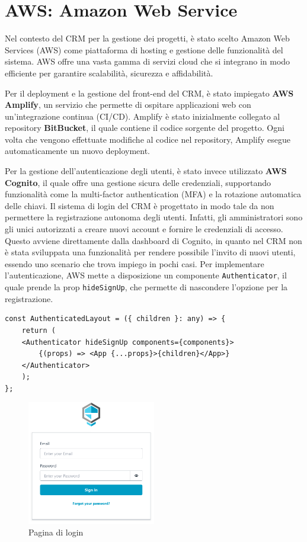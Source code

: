 \documentclass[target=bach,aauheader=,style=]{thud}
\begin{document}
\section{AWS: Amazon Web Service}
Nel contesto del CRM per la gestione dei progetti, è stato scelto Amazon Web Services (AWS) come piattaforma di hosting e gestione delle funzionalità del sistema. AWS offre una vasta gamma di servizi cloud che si integrano in modo efficiente per garantire scalabilità, sicurezza e affidabilità.

\noindent Per il deployment e la gestione del front-end del CRM, è stato impiegato \textbf{AWS Amplify}, un servizio che permette di ospitare applicazioni web con un'integrazione continua (CI/CD). Amplify è stato inizialmente collegato al repository \textbf{BitBucket}, il quale contiene il codice sorgente del progetto. Ogni volta che vengono effettuate modifiche al codice nel repository, Amplify esegue automaticamente un nuovo deployment.

\noindent Per la gestione dell'autenticazione degli utenti, è stato invece utilizzato \textbf{AWS Cognito}, il quale offre una gestione sicura delle credenziali, supportando funzionalità come la multi-factor authentication (MFA) e la rotazione automatica delle chiavi. Il sistema di login del CRM è progettato in modo tale da non permettere la registrazione autonoma degli utenti. Infatti, gli amministratori sono gli unici autorizzati a creare nuovi account e fornire le credenziali di accesso. Questo avviene direttamente dalla dashboard di Cognito, in quanto nel CRM non è stata sviluppata una funzionalità per rendere possibile l'invito di nuovi utenti, essendo uno scenario che trova impiego in pochi casi. Per implementare l'autenticazione, AWS mette a disposizione un componente \texttt{Authenticator}, il quale prende la prop \texttt{hideSignUp}, che permette di nascondere l'opzione per la registrazione.

\begin{lstlisting}[caption=Parte del file \texttt{AuthenticatedLayout.tsx} del CRM]
const AuthenticatedLayout = ({ children }: any) => {
    return (
    <Authenticator hideSignUp components={components}>
        {(props) => <App {...props}>{children}</App>}
    </Authenticator>
    );
};
\end{lstlisting}

\begin{figure}[H]
    \centering
    \includegraphics[width=0.5\textwidth]{img/login.pdf} 
    \caption{Pagina di login}
\end{figure}
\end{document}
